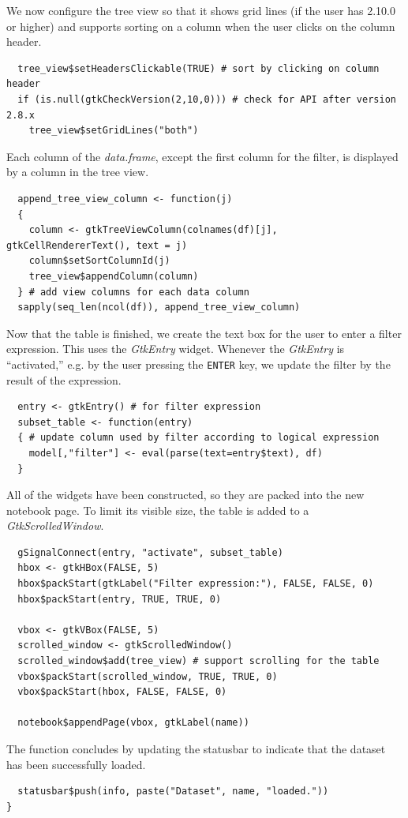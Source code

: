 \documentclass[article]{jss}
\begin{document}
We now configure the tree view so that it shows grid lines (if the user
has  2.10.0 or higher) and supports sorting on a column when
the user clicks on the column header.
\begin{verbatim}
  tree_view$setHeadersClickable(TRUE) # sort by clicking on column header
  if (is.null(gtkCheckVersion(2,10,0))) # check for API after version 2.8.x
    tree_view$setGridLines("both")
\end{verbatim}
Each column of the \emph{data.frame}, except the first column for the filter,
is displayed by a column in the tree view.
\begin{verbatim}
  append_tree_view_column <- function(j)
  {
    column <- gtkTreeViewColumn(colnames(df)[j], gtkCellRendererText(), text = j)
    column$setSortColumnId(j)
    tree_view$appendColumn(column)
  } # add view columns for each data column
  sapply(seq_len(ncol(df)), append_tree_view_column)
\end{verbatim}
Now that the table is finished, we create the text box for the user to enter
a filter expression. This uses the \emph{GtkEntry} widget. Whenever the
\emph{GtkEntry} is ``activated,'' e.g. by the user pressing the \texttt{ENTER}
key, we update the filter by the result of the  expression.
\begin{verbatim}
  entry <- gtkEntry() # for filter expression
  subset_table <- function(entry)
  { # update column used by filter according to logical expression
    model[,"filter"] <- eval(parse(text=entry$text), df)
  }
\end{verbatim}
All of the widgets have been constructed, so they are packed into the new notebook page.
To limit its visible size, the table is added to a \emph{GtkScrolledWindow}.
\begin{verbatim}
  gSignalConnect(entry, "activate", subset_table)
  hbox <- gtkHBox(FALSE, 5)
  hbox$packStart(gtkLabel("Filter expression:"), FALSE, FALSE, 0)
  hbox$packStart(entry, TRUE, TRUE, 0)

  vbox <- gtkVBox(FALSE, 5)
  scrolled_window <- gtkScrolledWindow()
  scrolled_window$add(tree_view) # support scrolling for the table
  vbox$packStart(scrolled_window, TRUE, TRUE, 0)
  vbox$packStart(hbox, FALSE, FALSE, 0)
  
  notebook$appendPage(vbox, gtkLabel(name))
\end{verbatim}
The function concludes by updating the statusbar to indicate that the dataset
has been successfully loaded.
\begin{verbatim}
  statusbar$push(info, paste("Dataset", name, "loaded."))
}
\end{verbatim}
\end{document}
